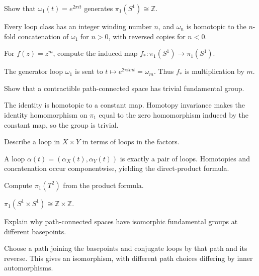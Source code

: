 \begin{problem}\label{prob:viii09-06}
Show that \(\omega_1(t)=e^{2\pi it}\) generates \(\pi_1(S^1)\cong\mathbb Z\).
\end{problem}
\begin{solution}
Every loop class has an integer winding number \(n\), and \(\omega_n\) is homotopic to the \(n\)-fold concatenation of \(\omega_1\) for \(n>0\), with reversed copies for \(n<0\).
\end{solution}

\begin{problem}\label{prob:viii09-07}
For \(f(z)=z^m\), compute the induced map \(f_*:\pi_1(S^1)\to\pi_1(S^1)\).
\end{problem}
\begin{solution}
The generator loop \(\omega_1\) is sent to \(t\mapsto e^{2\pi imt}=\omega_m\).  Thus \(f_*\) is multiplication by \(m\).
\end{solution}

\begin{problem}\label{prob:viii09-08}
Show that a contractible path-connected space has trivial fundamental group.
\end{problem}
\begin{solution}
The identity is homotopic to a constant map.  Homotopy invariance makes the identity homomorphism on \(\pi_1\) equal to the zero homomorphism induced by the constant map, so the group is trivial.
\end{solution}

\begin{problem}\label{prob:viii09-09}
Describe a loop in \(X\times Y\) in terms of loops in the factors.
\end{problem}
\begin{solution}
A loop \(\alpha(t)=(\alpha_X(t),\alpha_Y(t))\) is exactly a pair of loops.  Homotopies and concatenation occur componentwise, yielding the direct-product formula.
\end{solution}

\begin{problem}\label{prob:viii09-10}
Compute \(\pi_1(T^2)\) from the product formula.
\end{problem}
\begin{solution}
\(\pi_1(S^1\times S^1)\cong\mathbb Z\times\mathbb Z\).
\end{solution}

\begin{problem}\label{prob:viii09-11}
Explain why path-connected spaces have isomorphic fundamental groups at different basepoints.
\end{problem}
\begin{solution}
Choose a path joining the basepoints and conjugate loops by that path and its reverse.  This gives an isomorphism, with different path choices differing by inner automorphisms.
\end{solution}

